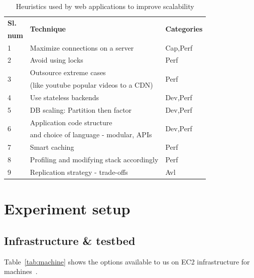 \documentclass[a4paper, twocolumn]{article}
\begin{document}
\FloatBarrier
\begin{table}
\centering
\begin{tabular}{|l|l|l|}
\hline
{\bf{Sl.}} & \multirow{2}{*}{\bf{Technique}} & \multirow{2}{*}{\bf{Categories}} \\
\bf{num} & & \\
\hline
1 & Maximize connections on a server & Cap,Perf \\
2 & Avoid using locks & Perf \\
\multirow{2}{*}{3} & Outsource extreme cases & \multirow{2}{*}{Perf} \\
& (like youtube popular videos to a CDN) & \\
4 & Use stateless backends & Dev,Perf \\
5 & DB scaling: Partition then factor & Dev,Perf\\
\multirow{2}{*}{6} & Application code structure & \multirow{2}{*}{Dev,Perf} \\
& and choice of language - modular, APIs & \\
7 & Smart caching & Perf\\
8 & Profiling and modifying stack accordingly & Perf\\
9 & Replication strategy - trade-offs & Avl\\
\hline
\end{tabular}
\caption{\label{tab:heuristics}Heuristics used by web applications to improve scalability}
\end{table}



\section{Experiment setup}

\subsection{Infrastructure \& testbed}

Table~\ref{tab:machine} shows the options available to us on EC2 infrastructure for machines~\cite{ec2_1}. 
\end{document}
